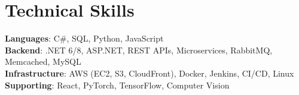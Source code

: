 \documentclass[letterpaper,11pt]{article}
\begin{document}
%
\section{Technical Skills}
 \begin{itemize}[leftmargin=0.15in, label={}]
    \small{\item{
     \textbf{Languages}{: C\#, SQL, Python, JavaScript} \\
     \textbf{Backend}{: .NET 6/8, ASP.NET, REST APIs, Microservices, RabbitMQ, Memcached, MySQL} \\
     \textbf{Infrastructure}{: AWS (EC2, S3, CloudFront), Docker, Jenkins, CI/CD, Linux} \\
     \textbf{Supporting}{: React, PyTorch, TensorFlow, Computer Vision}
    }}
 \end{itemize}


\end{document}
